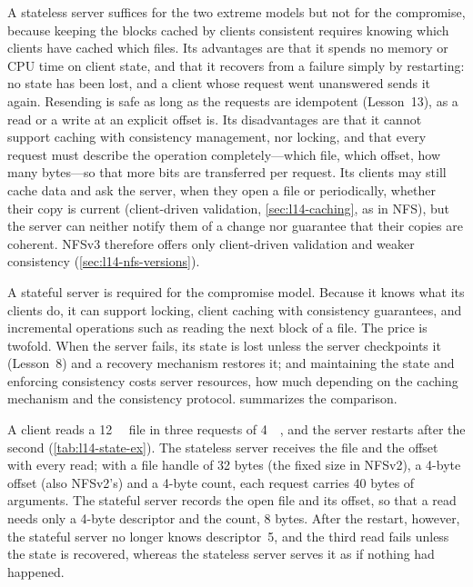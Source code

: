 \documentclass[../main.tex]{subfiles}
\begin{document}
A stateless server suffices for the two extreme models but not for the
compromise, because keeping the blocks cached by clients consistent
requires knowing which clients have cached which files.  Its advantages
are that it spends no memory or CPU time on client state, and that it
recovers from a failure simply by restarting: no state has been lost, and
a client whose request went unanswered sends it again.  Resending is safe
as long as the requests are idempotent (Lesson~13), as a read or a write at
an explicit offset is.
Its disadvantages are that it cannot support
caching with consistency management, nor locking, and that every request
must describe the operation completely---which file, which offset, how many
bytes---so that more bits are transferred per request.
Its clients may
still cache data and ask the server, when they open a file or
periodically, whether their copy is current (client-driven validation,
\cref{sec:l14-caching}, as in NFS), but the server can neither notify them
of a change nor guarantee that their copies are coherent.  NFSv3 therefore
offers only client-driven validation and weaker consistency
(\cref{sec:l14-nfs-versions}).

A stateful server is required for the compromise model.  Because it knows
what its clients do, it can support locking, client caching with
consistency guarantees, and incremental operations such as reading the
next block of a file.  The price is twofold.  When the server fails, its
state is lost unless the server checkpoints it (Lesson~8)%
 and a recovery mechanism restores it; and
maintaining the state and enforcing consistency costs server resources,
how much depending on the caching mechanism and the consistency protocol.
 summarizes the comparison.

\begin{example}
  A client reads a \SI{12}{\kibi\byte} file in three requests of
  \SI{4}{\kibi\byte}, and the server restarts after the second
  (\cref{tab:l14-state-ex}).  The stateless server receives the file and the
  offset with every read; with a file handle of 32 bytes (the fixed size
  in NFSv2), a 4-byte offset (also NFSv2's) and a 4-byte count, each
  request carries 40 bytes of arguments.  The stateful server records the open
  file and its offset, so that a read needs only a 4-byte descriptor and
  the count, 8 bytes.  After the restart, however, the stateful server no
  longer knows descriptor~5, and the third read fails unless the state is
  recovered, whereas the stateless server serves it as if nothing had
  happened.
\end{example}
\end{document}
